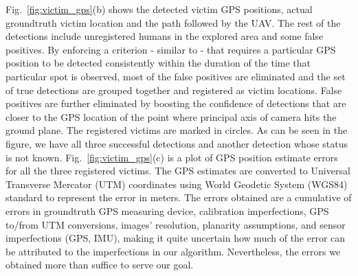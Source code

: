 \documentclass[runningheads]{llncs}
\begin{document}
Fig.~\ref{fig:victim_gps}(b) shows the detected victim GPS positions, actual groundtruth victim location and the path followed by the UAV. The rest of the detections include unregistered humans in the explored area and some false positives. By enforcing a criterion - similar to \cite{rudol2008human} - that requires a particular GPS position to be detected consistently within the duration of the time that particular spot is observed, most of the false positives are eliminated and the set of true detections are grouped together and registered as victim locations. False positives are further eliminated by boosting the confidence of detections that are closer to the GPS location of the point where principal axis of camera hits the ground plane. The registered victims are marked in circles. As can be seen in the figure, we have all three successful detections and another detection whose status is not known. Fig.~\ref{fig:victim_gps}(c) is a plot of GPS position estimate errors for all the three registered victims. The GPS estimates are converted to Universal Transverse Mercator (UTM) coordinates using World Geodetic System (WGS84) standard \cite{WGS} to represent the error in meters. The errors obtained are a cumulative of errors in groundtruth GPS measuring device, calibration imperfections, GPS to/from UTM conversions, images' resolution, planarity assumptions, and sensor imperfections (GPS, IMU), making it quite uncertain how much of the error can be attributed to the imperfections in our algorithm. Nevertheless, the errors we obtained more than suffice to serve our goal.
\end{document}
